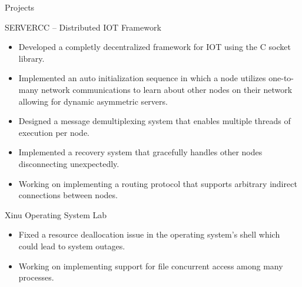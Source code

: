 \documentclass[]{article}
\newlength{\tabin}
\newlength{\secsep}
\newcommand{\lineunder}{\vspace*{-8pt} \\ \hspace*{-6pt} \hrulefill \\ \vspace*{-15pt}}
\newenvironment{tabbedsection}[1]{
  \begin{list}{}{
      \setlength{\itemsep}{0pt}
      \setlength{\labelsep}{0pt}
      \setlength{\labelwidth}{0pt}
      \setlength{\leftmargin}{\tabin}
      \setlength{\rightmargin}{\tabin}
      \setlength{\listparindent}{0pt}
      \setlength{\parsep}{0pt}
      \setlength{\parskip}{0pt}
      \setlength{\partopsep}{0pt}
      \setlength{\topsep}{#1}
    }
  \item[]
}{\end{list}}
\newenvironment{resume_section}[1]{
  \filbreak
  \vspace{2\secsep}
  \textsc{\large#1}
  \lineunder
  \begin{tabbedsection}{\secsep}
}{\end{tabbedsection}}
\newenvironment{resume_subsection}[2][]{
  \textbf{#2} \hfill {\footnotesize #1} \hspace{2em}
  \begin{tabbedsection}{0.5\secsep}
}{\end{tabbedsection}}
\newenvironment{subitems}{
  \renewcommand{\labelitemi}{-}
  \begin{itemize}
      \setlength{\labelsep}{1em}
}{\end{itemize}}
\begin{document}

\begin{resume_section}{Projects}

	\begin{resume_subsection}{SERVERCC -- Distributed IOT Framework}

		\begin{subitems}

			\item Developed a completly decentralized framework for IOT using the C socket library.

			\item Implemented an auto initialization sequence in which a node utilizes one-to-many
			network communications to learn about other nodes on their network allowing
			for dynamic asymmetric servers.

			\item Designed a message demultiplexing system that enables multiple threads of
			execution per node.

			\item Implemented a recovery system that gracefully handles other nodes disconnecting
			unexpectedly.

			\item Working on implementing a routing protocol that supports arbitrary indirect
			connections between nodes.

		\end{subitems}

	\end{resume_subsection}

	\begin{resume_subsection}[]{Xinu Operating System Lab}

		\begin{subitems}

			\item Fixed a resource deallocation issue in the operating system's shell which could
			lead to system outages.

			\item Working on implementing support for file concurrent access among many processes.

		\end{subitems}

	\end{resume_subsection}

\end{resume_section}
\end{document}
